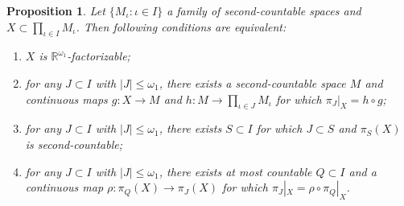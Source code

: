 \documentclass[a4paper,12pt]{amsart}
\newtheorem{proposition}{Proposition}[section]
\theoremstyle{definition}
\theoremstyle{remark}
\begin{document}
\begin{proposition}
\label{Proposition_3.2}
Let $\{M_\iota:\iota\in I\}$ a family of second-countable spaces and $X\subset \prod_{\iota\in I}M_\iota$.
Then following conditions are equivalent:
\begin{enumerate}
\item[\rm (1)]
$X$ is $\mathbb R^{\omega_1}$-factorizable;
\item[\rm (2)]
for any $J\subset I$ with $|J|\le\omega_1$, there exists a second-countable space 
$M$ and continuous maps $g\colon X\to M$ and $h\colon M\to \prod_{\iota\in J}M_\iota$ 
for which $\pi_J|_{X} = h\circ g$; 
\item[\rm (3)]
for any $J\subset I$ with $|J|\le\omega_1$, there exists  $S\subset I$ for which $J\subset S$ and $\pi_S(X)$ is second-countable;
\item[\rm (4)]
for any $J\subset I$ with $|J|\le\omega_1$, there exists at most countable $Q\subset I$ 
and a continuous map $\rho\colon \pi_Q(X)\to \pi_J(X)$
for which 
$\pi_J|_X = \rho\circ \pi_Q|_X$.
\end{enumerate}
\end{proposition}
\end{document}
